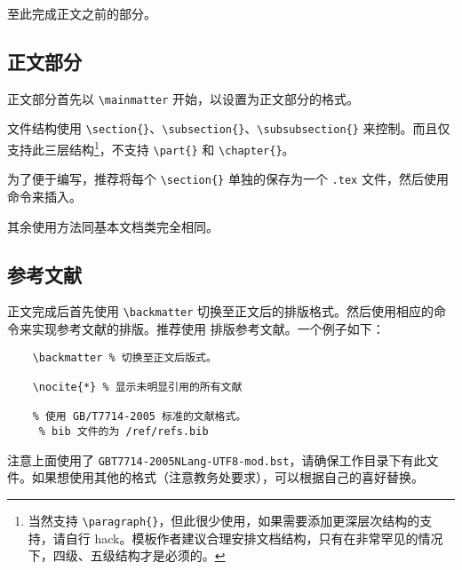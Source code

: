 \documentclass[%
               print, 
               timesmath
              ]{xjtubsc}
\begin{document}
至此完成正文之前的部分。

\subsection{正文部分}

正文部分首先以 \verb|\mainmatter| 开始，以设置为正文部分的格式。

文件结构使用 \verb|\section{}|、\verb|\subsection{}|、\verb|\subsubsection{}| 来控制。而且仅支持此三层结构\footnote{当然支持 \verb|\paragraph{}|，但此很少使用，如果需要添加更深层次结构的支持，请自行 hack。模板作者建议合理安排文档结构，只有在非常罕见的情况下，四级、五级结构才是必须的。}，不支持 \verb|\part{}| 和 \verb|\chapter{}|。

为了便于编写，推荐将每个 \verb|\section{}| 单独的保存为一个 \verb|.tex| 文件，然后使用 \verb|| 命令来插入。

其余使用方法同基本文档类完全相同。

\subsection{参考文献}

正文完成后首先使用 \verb|\backmatter| 切换至正文后的排版格式。然后使用相应的命令来实现参考文献的排版。推荐使用  排版参考文献。一个例子如下：
\begin{verbatim}
    \backmatter % 切换至正文后版式。

    \nocite{*} % 显示未明显引用的所有文献
     
    % 使用 GB/T7714-2005 标准的文献格式。
     % bib 文件的为 /ref/refs.bib
\end{verbatim}
注意上面使用了 \verb|GBT7714-2005NLang-UTF8-mod.bst|，请确保工作目录下有此文件。如果想使用其他的格式（注意教务处要求），可以根据自己的喜好替换。
\end{document}
